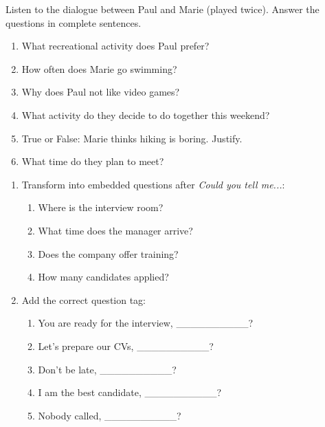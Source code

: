\documentclass[11pt]{article}
\begin{document}
\begin{exercice}
Listen to the dialogue between Paul and Marie (played twice). Answer the questions in complete sentences.
\begin{enumerate}
    \item What recreational activity does Paul prefer?
    \item How often does Marie go swimming?
    \item Why does Paul not like video games?
    \item What activity do they decide to do together this weekend?
    \item True or False: Marie thinks hiking is boring. Justify.
    \item What time do they plan to meet?
\end{enumerate}
\end{exercice}

\begin{exercice}
\begin{enumerate}
    \item Transform into embedded questions after \emph{Could you tell me...}:
    \begin{enumerate}
        \item Where is the interview room?
        \item What time does the manager arrive?
        \item Does the company offer training?
        \item How many candidates applied?
    \end{enumerate}
    \item Add the correct question tag:
    \begin{enumerate}
        \item You are ready for the interview, \_\_\_\_\_\_\_\_\_\_?
        \item Let's prepare our CVs, \_\_\_\_\_\_\_\_\_\_?
        \item Don't be late, \_\_\_\_\_\_\_\_\_\_?
        \item I am the best candidate, \_\_\_\_\_\_\_\_\_\_?
        \item Nobody called, \_\_\_\_\_\_\_\_\_\_?
    \end{enumerate}
\end{enumerate}
\end{exercice}
\end{document}
